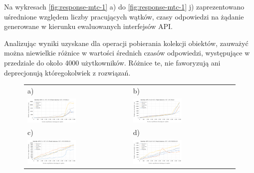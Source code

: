 Na wykresach \ref{fig:response-mtc-1} a) do \ref{fig:response-mtc-1} j) zaprezentowano uśrednione względem liczby pracujących wątków, czasy odpowiedzi na żądanie generowane w kierunku ewaluowanych interfejsów API.

Analizując wyniki uzyskane dla operacji pobierania kolekcji obiektów, zauważyć można niewielkie różnice w wartości średnich czasów odpowiedzi, występujące w przedziale do około 4000 użytkowników. Różnice te, nie faworyzują ani deprecjonują któregokolwiek z rozwiązań.

\begin{figure}[H]
  \centering
	\begin{tabular}{@{}ll@{}}
    a) & b) \\
    \includegraphics[width=0.49\textwidth]{rys05/response-dotnet-fetchAllBills.pdf} & \includegraphics[width=0.49\textwidth]{rys05/response-nodejs-fetchAllBills.pdf} \\
    c) & d) \\
    \includegraphics[width=0.49\textwidth]{rys05/response-dotnet-getSingleOrder.pdf} & \includegraphics[width=0.49\textwidth]{rys05/response-nodejs-getSingleOrder.pdf} \\

\end{tabular}
\end{figure}
